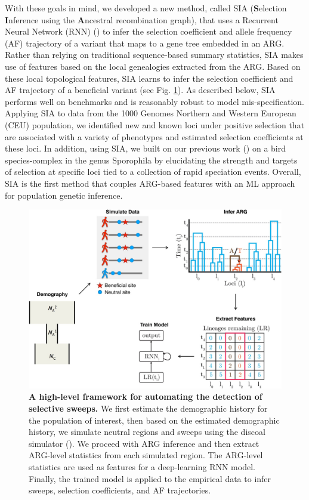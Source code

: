 With these goals in mind, we developed a new method, called SIA (\textbf{S}election \textbf{I}nference using the \textbf{A}ncestral recombination graph), that uses a Recurrent Neural Network (RNN) (\cite{hochreiter_long_1997,maas_learning_2011}) to infer the selection coefficient and allele frequency (AF) trajectory of a variant that maps to a gene tree embedded in an ARG. Rather than relying on traditional sequence-based summary statistics, SIA makes use of features based on the local genealogies extracted from the ARG. Based on these local topological features, SIA learns to infer the selection coefficient and AF trajectory of a beneficial variant (see Fig. \ref{fig:SIA-F1}). As described below, SIA performs well on benchmarks and is reasonably robust to model mis-specification. Applying SIA to data from the 1000 Genomes Northern and Western European (CEU) population, we identified new and known loci under positive selection that are associated with a variety of phenotypes and estimated selection coefficients at these loci. In addition, using SIA, we built on our previous work (\cite{hejase_genomic_2020}) on a bird species-complex in the genus Sporophila by elucidating the strength and targets of selection at specific loci tied to a collection of rapid speciation events. Overall, SIA is the first method that couples ARG-based features with an ML approach for population genetic inference.

\begin{figure}[h]
    \centering
    \includegraphics[width=\textwidth]{SIA_figs/SIA_F1.jpeg}
    \caption[A high-level framework for automating the detection of selective sweeps.]{\textbf{A high-level framework for automating the detection of selective sweeps.} We first estimate the demographic history for the population of interest, then based on the estimated demographic history, we simulate neutral regions and sweeps using the discoal simulator (\cite{kern_discoal_2016}). We proceed with ARG inference and then extract ARG-level statistics from each simulated region. The ARG-level statistics are used as features for a deep-learning RNN model. Finally, the trained model is applied to the empirical data to infer sweeps, selection coefficients, and AF trajectories.}
    \label{fig:SIA-F1}
\end{figure}

